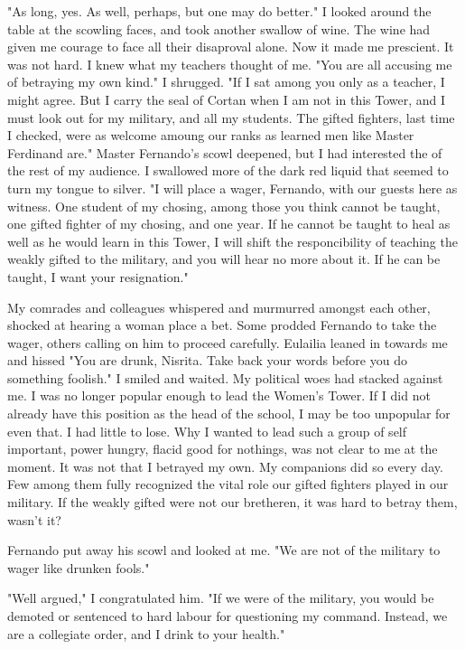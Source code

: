 \documentclass{article}
\begin{document}
"As long, yes. As well, perhaps, but one may do better." I looked around the table at the scowling faces, and took another swallow of wine. The wine had given me courage to face all their disaproval alone. Now it made me prescient. It was not hard. I knew what my teachers thought of me. "You are all accusing me of betraying my own kind." I shrugged. "If I sat among you only as a teacher, I might agree. But I carry the seal of Cortan when I am not in this Tower, and I must look out for my military, and all my students. The gifted fighters, last time I checked, were as welcome amoung our ranks as learned men like Master Ferdinand are." Master Fernando's scowl deepened, but I had interested the of the rest of my audience. I swallowed more of the dark red liquid that seemed to turn my tongue to silver. "I will place a wager, Fernando, with our guests here as witness. One student of my chosing, among those you think cannot be taught, one gifted fighter of my chosing, and one year. If he cannot be taught to heal as well as he would learn in this Tower, I will shift the responcibility of teaching the weakly gifted to the military, and you will hear no more about it. If he can be taught, I want your resignation."

My comrades and colleagues whispered and murmurred amongst each other, shocked at hearing a woman place a bet. Some prodded Fernando to take the wager, others calling on him to proceed carefully. Eulailia leaned in towards me and hissed "You are drunk, Nisrita. Take back your words before you do something foolish." I smiled and waited. My political woes had stacked against me. I was no longer popular enough to lead the Women's Tower. If I did not already have this position as the head of the school, I may be too unpopular for even that. I had little to lose. Why I wanted to lead such a group of self important, power hungry, flacid good for nothings, was not clear to me at the moment. It was not that I betrayed my own. My companions did so every day. Few among them fully recognized the vital role our gifted fighters played in our military. If the weakly gifted were not our bretheren, it was hard to betray them, wasn't it?

Fernando put away his scowl and looked at me. "We are not of the military to wager like drunken fools."

"Well argued," I congratulated him. "If we were of the military, you would be demoted or sentenced to hard labour for questioning my command. Instead, we are a collegiate order, and I drink to your health."
\end{document}
